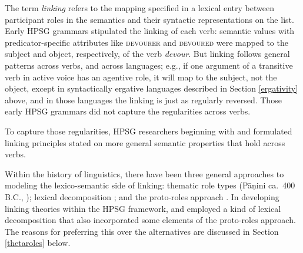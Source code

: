 \documentclass[output=paper
	        ,collection
	        ,collectionchapter
 	        ,biblatex
                ,babelshorthands
                ,newtxmath
                ,draftmode
                ,colorlinks, citecolor=brown
]{langscibook}
\begin{document}
The term \textit{linking} refers to the mapping specified in a lexical entry between participant roles  in the semantics and their syntactic representations on the \argst list.  
Early HPSG grammars stipulated the linking of each verb:  semantic \content values with predicator-specific attributes like \textsc{devourer} and \textsc{devoured} were mapped to the subject and object, respectively, of the verb \textit{devour}.  But linking follows general patterns across verbs, and across languages; e.g., if one argument of a transitive verb in active voice has an agentive role, it will map to the subject, not the object, 
except in syntactically ergative languages described in Section \ref{ergativity} above, and in those languages the linking is just as regularly reversed.
Those early HPSG grammars did not capture the regularities across verbs.  

To capture those regularities, HPSG researchers beginning with \citet{Wechsler1995b} and \citet{Davis1996} formulated linking principles stated on more general semantic properties that hold across verbs.  

Within the history of linguistics, there have been three general approaches to modeling the lexico-semantic side of linking: thematic role types 
(P\={a}\d{n}ini ca.\ 400 B.C., \citealt{Fillmore1968}); lexical decomposition  \citep{FoleyandvanValin1984,RappaportandLevin1998}; and the proto-roles approach  \citep{Dowty1991}.   In developing linking theories within the HPSG framework, \citet{Wechsler1995b} and \citet{Davis1996} employed a kind of lexical decomposition that also incorporated some elements of the proto-roles approach.  The reasons for preferring this over the alternatives are discussed in Section \ref{thetaroles} below.  
\end{document}
